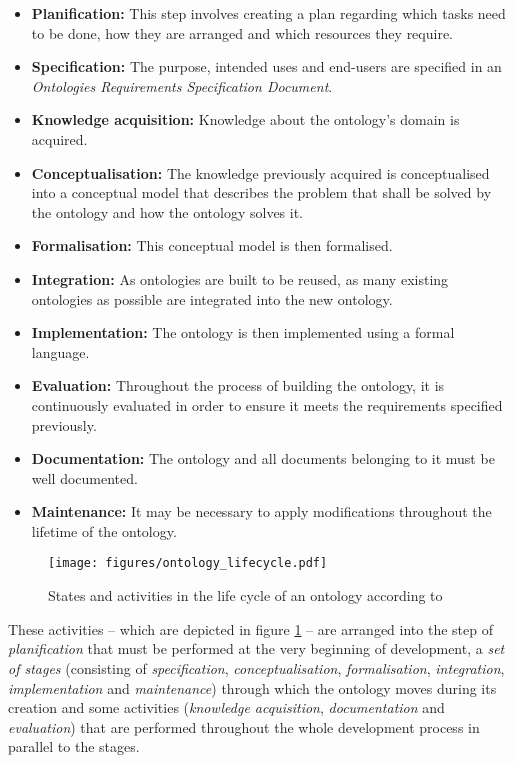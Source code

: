 \begin{itemize}
  \item \textbf{Planification:} This step involves creating a plan regarding which tasks need to be done, how they are arranged and which resources they require.
  \item \textbf{Specification:} The purpose, intended uses and end-users are specified in an \emph{Ontologies Requirements Specification Document}.
  \item \textbf{Knowledge acquisition:} Knowledge about the ontology's domain is acquired.
  \item \textbf{Conceptualisation:} The knowledge previously acquired is conceptualised into a conceptual model that describes the problem that shall be solved by the ontology and how the ontology solves it.
  \item \textbf{Formalisation:} This conceptual model is then formalised.
  \item \textbf{Integration:} As ontologies are built to be reused, as many existing ontologies as possible are integrated into the new ontology.
  \item \textbf{Implementation:} The ontology is then implemented using a formal language.
  \item \textbf{Evaluation:} Throughout the process of building the ontology, it is continuously evaluated in order to ensure it meets the requirements specified previously.
  \item \textbf{Documentation:} The ontology and all documents belonging to it must be well documented.
  \item \textbf{Maintenance:} It may be necessary to apply modifications throughout the lifetime of the ontology.
\end{itemize}

\begin{figure}
  \texttt{[image: figures/ontology\_lifecycle.pdf]}
  \caption{States and activities in the life cycle of an ontology according to \methontology \cite{Methontology}}
  \label{fig:methontology1}
\end{figure}

These activities -- which are depicted in figure \ref{fig:methontology1} -- are arranged into the step of \emph{planification} that must be performed at the very beginning of development, a \emph{set of stages} (consisting of \emph{specification}, \emph{conceptualisation}, \emph{formalisation}, \emph{integration}, \emph{implementation} and \emph{maintenance}) through which the ontology moves during its creation and some activities (\emph{knowledge acquisition}, \emph{documentation} and \emph{evaluation}) that are performed throughout the whole development process in parallel to the stages.

